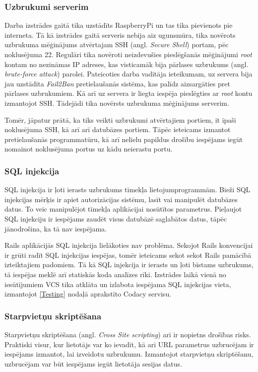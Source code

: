 \subsubsection{Uzbrukumi serverim}
Darba izstrādes gaitā tika uzstādīts RaspberryPi un tas tika pievienots pie interneta. Tā kā izstrādes gaitā serveris nebija aiz ugunsmūra, tika novērots uzbrukuma mēģinājums atvērtajam SSH (angl. \textit{Secure Shell}) portam, pēc noklusējuma 22. Regulāri tika novēroti neizdevušies pieslēgšanās mēģinājumi \textit{root} kontam no nezināmas IP adreses, kas visticamāk bija pārlases uzbrukums (angl. \textit{brute-force attack}) parolei. Pateicoties darba vadītāja ieteikumam, uz servera bija jau uzstādīta \textit{Fail2Ban} pretielaušanās sistēma, kas palīdz aizsargāties pret pārlases uzbrukumiem. Kā arī uz servera ir liegta iespēja pieslēgties ar \textit{root} kontu izmantojot SSH. Tādejādi tika novērsts uzbrukuma mēģinājums serverim.

Tomēr, jāpatur prātā, ka tiks veikti uzbrukumi atvērtajiem portiem, it īpaši noklusējuma SSH, kā arī arī datubāzes portiem. Tāpēc ieteicams izmantot pretielaušanās programmatūru, kā arī nelielu papildus drošību iespējams iegūt nomainot noklusējuma portus uz kādu neierastu portu.

\subsubsection{SQL injekcija}
SQL injekcija ir ļoti ierasts uzbrukums tīmekļa lietojumprogrammām. Bieži SQL injekcijas mērķis ir apiet autorizācijas sistēmu, lasīt vai manipulēt datubāzes datus. To veic manipulējot tīmekļa aplikācijai nosūtītos parametrus. Pieļaujot SQL injekciju ir iespējams zaudēt visus datubāzē saglabātos datus, tāpēc jānodrošina, ka tā nav iespējama.

Rails aplikācijās SQL injekcija lielākoties nav problēma. Sekojot Rails konvencijai ir grūti radīt SQL injekcijas iespējas, tomēr ieteicams sekot sekot Rails pamācībā \cite[security]{rails-guides} izteiktajiem padomiem. Tā kā SQL injekcija ir ierasts un ļoti bīstams uzbrukums, tā iespējas meklē arī statiskās koda analīzes rīki. Izstrādes laikā vienā no iesūtījumiem VCS tika atklāta un izlabota iespējama SQL injekcijas vieta, izmantojot \ref{Testing} nodaļā aprakstīto Codacy servisu.

\subsubsection{Starpvietņu skriptēšana}
Starpvietņu skriptēšana (angl. \textit{Cross Site scripting}) arī ir nopietns drošības risks. Praktiski visur, kur lietotājs var ko ievadīt, kā arī URL parametrus uzbrucējam ir iespējams izmantot, lai izveidotu uzbrukumu. Izmantojot starpvietņu skriptēšanu, uzbrucējam var būt iespējams iegūt lietotāja sesijas datus.

